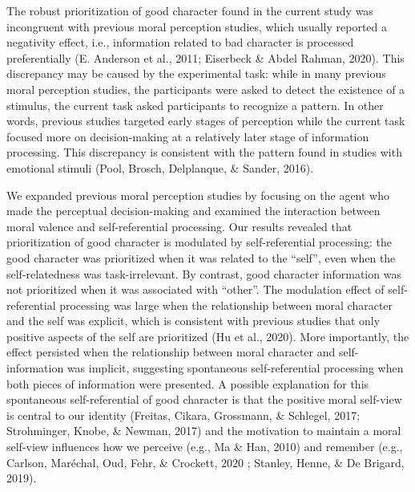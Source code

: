 \documentclass[
  man]{apa6}
\begin{document}
The robust prioritization of good character found in the current study was incongruent with previous moral perception studies, which usually reported a negativity effect, i.e., information related to bad character is processed preferentially (E. Anderson et al., 2011; Eiserbeck \& Abdel Rahman, 2020). This discrepancy may be caused by the experimental task: while in many previous moral perception studies, the participants were asked to detect the existence of a stimulus, the current task asked participants to recognize a pattern. In other words, previous studies targeted early stages of perception while the current task focused more on decision-making at a relatively later stage of information processing. This discrepancy is consistent with the pattern found in studies with emotional stimuli (Pool, Brosch, Delplanque, \& Sander, 2016).

We expanded previous moral perception studies by focusing on the agent who made the perceptual decision-making and examined the interaction between moral valence and self-referential processing. Our results revealed that prioritization of good character is modulated by self-referential processing: the good character was prioritized when it was related to the ``self'', even when the self-relatedness was task-irrelevant. By contrast, good character information was not prioritized when it was associated with ``other''. The modulation effect of self-referential processing was large when the relationship between moral character and the self was explicit, which is consistent with previous studies that only positive aspects of the self are prioritized (Hu et al., 2020). More importantly, the effect persisted when the relationship between moral character and self-information was implicit, suggesting spontaneous self-referential processing when both pieces of information were presented. A possible explanation for this spontaneous self-referential of good character is that the positive moral self-view is central to our identity (Freitas, Cikara, Grossmann, \& Schlegel, 2017; Strohminger, Knobe, \& Newman, 2017) and the motivation to maintain a moral self-view influences how we perceive (e.g., Ma \& Han, 2010) and remember (e.g., Carlson, Maréchal, Oud, Fehr, \& Crockett, 2020 ; Stanley, Henne, \& De Brigard, 2019).
\end{document}
